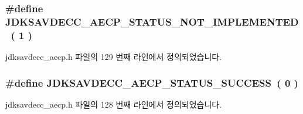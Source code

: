 \subsubsection[{\texorpdfstring{J\+D\+K\+S\+A\+V\+D\+E\+C\+C\+\_\+\+A\+E\+C\+P\+\_\+\+S\+T\+A\+T\+U\+S\+\_\+\+N\+O\+T\+\_\+\+I\+M\+P\+L\+E\+M\+E\+N\+T\+ED}{JDKSAVDECC_AECP_STATUS_NOT_IMPLEMENTED}}]{\setlength{\rightskip}{0pt plus 5cm}\#define J\+D\+K\+S\+A\+V\+D\+E\+C\+C\+\_\+\+A\+E\+C\+P\+\_\+\+S\+T\+A\+T\+U\+S\+\_\+\+N\+O\+T\+\_\+\+I\+M\+P\+L\+E\+M\+E\+N\+T\+ED~( 1 )}\hypertarget{group__aecp__status_gabd4075dd2cc8d8dfed22f12df7a2bd1d}{}\label{group__aecp__status_gabd4075dd2cc8d8dfed22f12df7a2bd1d}


jdksavdecc\+\_\+aecp.\+h 파일의 129 번째 라인에서 정의되었습니다.

\subsubsection[{\texorpdfstring{J\+D\+K\+S\+A\+V\+D\+E\+C\+C\+\_\+\+A\+E\+C\+P\+\_\+\+S\+T\+A\+T\+U\+S\+\_\+\+S\+U\+C\+C\+E\+SS}{JDKSAVDECC_AECP_STATUS_SUCCESS}}]{\setlength{\rightskip}{0pt plus 5cm}\#define J\+D\+K\+S\+A\+V\+D\+E\+C\+C\+\_\+\+A\+E\+C\+P\+\_\+\+S\+T\+A\+T\+U\+S\+\_\+\+S\+U\+C\+C\+E\+SS~( 0 )}\hypertarget{group__aecp__status_gafd8dc6f23c5146eed35fef042ffd9ebc}{}\label{group__aecp__status_gafd8dc6f23c5146eed35fef042ffd9ebc}


jdksavdecc\+\_\+aecp.\+h 파일의 128 번째 라인에서 정의되었습니다.

